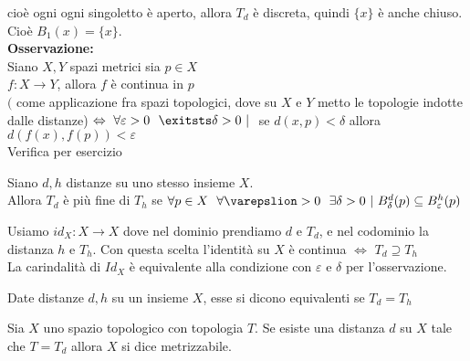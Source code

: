 \documentclass[12px]{article}
\begin{document}
	cioè ogni ogni singoletto è aperto, allora  $T_d$ è discreta, quindi $\{x\}$ è anche chiuso. Cioè $B_1(x) = \{x\}$.\\
	 \textbf{Osservazione:}\\
	 Siano $X,Y$ spazi metrici sia $p\in X$\\
	  $f: X \rightarrow Y$, allora $f$ è continua in $p$\\
	   $($ come applicazione fra spazi topologici, dove su $X $ e $Y$ metto le topologie indotte dalle distanze) $ \Leftrightarrow \  \forall \varepsilon > 0 \ \ \exitsts \delta > 0 \ | \ $ se $d(x,p) < \delta$ allora  $d(f(x),f(p)) < \varepsilon$\\
	   Verifica per esercizio
	   \begin{coro}
	   	Siano $d, h$ distanze su uno stesso insieme $X.$\\
		Allora  $T_d$ è più fine di $T_h$ se $\forall p\in X \ \ \forall \varepslion > 0\ \ \exists \delta > 0 \ |  \ B_\delta^d(p)\subseteq B_\varepsilon ^h(p)$
	   \end{coro}
	   \begin{dimo}
	   	Usiamo $id_X: X \rightarrow X$ dove nel dominio prendiamo $d$ e $T_d$, e nel codominio la distanza $h$ e $T_h$. Con questa scelta l'identità su $X$ è continua $ \Leftrightarrow$ $T_d\supseteq T_h$\\
		La carindalità di  $Id_X$ è equivalente alla condizione con $\varepsilon$ e $\delta$ per l'osservazione.
	   \end{dimo}
	   \begin{defi}
	   	Date distanze $d,h$ su un insieme $X$, esse si dicono equivalenti se $T_d = T_h$
	   \end{defi}
	   \begin{defi}
	   	Sia $X$ uno spazio topologico con topologia $T$. Se esiste una distanza $d$ su $X$ tale che $T = T_d$ allora $X$ si dice metrizzabile.
	   \end{defi}
\end{document}
